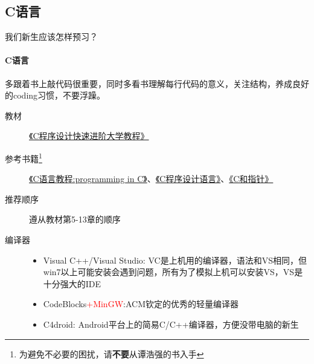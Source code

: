 \documentclass{beamer}
\begin{document}
\subsection{C语言}
\begin{frame}{我们新生应该怎样预习？}
  \framesubtitle{C语言}
  \begin{block}{}
  多跟着书上敲代码很重要，同时多看书理解每行代码的意义，关注结构，养成良好的coding习惯，不要浮躁。
  \end{block}
  \begin{description}
    \item[教材\faGraduationCap] \href{http://opac.lib.dlut.edu.cn/opac/item.php?marc_no=2010028166}{《C程序设计快速进阶大学教程》}
    \item[参考书籍\footnote{为避免不必要的困扰，请\textbf{不要}从谭浩强的书入手}\faBook] \href{http://opac.lib.dlut.edu.cn/opac/item.php?marc_no=2007039426}{《C语言教程:programming in C》}、\href{http://opac.lib.dlut.edu.cn/opac/item.php?marc_no=2003046536}{《C程序设计语言》}、\href{http://opac.lib.dlut.edu.cn/opac/item.php?marc_no=2008007312}{《C和指针》} 
    \item[推荐顺序\faSortNumericAsc] 遵从教材第5-13章的顺序 
    \item[编译器\faEdit] 
    \begin{itemize}
     \item Visual C++/Visual Studio: VC是上机用的编译器，语法和VS相同，但win7以上可能安装会遇到问题，所有为了模拟上机可以安装VS，VS是十分强大的IDE
     \item CodeBlocks\textcolor{red}{+MinGW}:ACM钦定的优秀的轻量编译器
     \item C4droid: Android平台上的简易C/C++编译器，方便没带电脑的新生
    \end{itemize}
  \end{description}
\end{frame}
\end{document}
